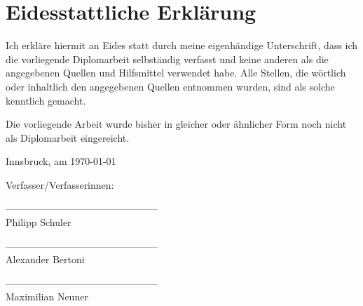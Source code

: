 \section*{Eidesstattliche Erklärung}

Ich erkläre hiermit an Eides statt durch meine eigenhändige Unterschrift, dass ich die vorliegende Diplomarbeit selbständig verfasst und keine anderen als die angegebenen Quellen und Hilfsmittel verwendet habe. Alle Stellen, die wörtlich oder inhaltlich den angegebenen Quellen entnommen wurden, sind als solche kenntlich gemacht.

Die vorliegende Arbeit wurde bisher in gleicher oder ähnlicher Form noch nicht als Diplomarbeit eingereicht.

Innsbruck, am \today

\vspace*{3cm}


Verfasser/Verfasserinnen:

\vspace*{2cm}


-----------------------------------------------\\
\hspace*{1.3cm}           Philipp Schuler

\vspace*{2cm}


-----------------------------------------------\\
\hspace*{1.3cm}           Alexander Bertoni

\vspace*{2cm}


-----------------------------------------------\\
\hspace*{1.3cm}           Maximilian Neuner


\newpage